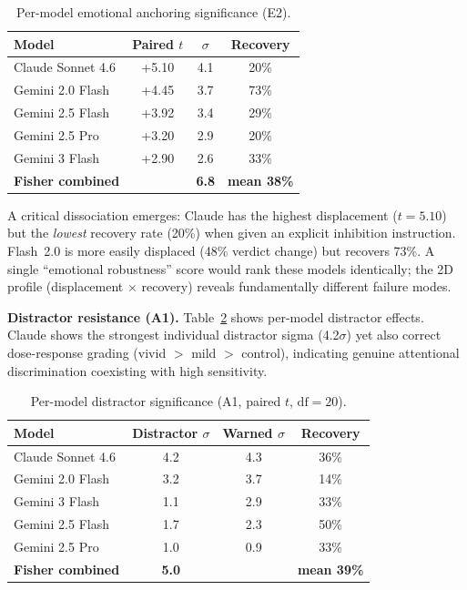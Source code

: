 \documentclass[conference]{IEEEtran}
\begin{document}
\begin{table}[htbp]
\caption{Per-model emotional anchoring significance (E2).}
\label{tab:e2sigma}
\centering
\begin{tabular}{@{}lccc@{}}
\toprule
\textbf{Model} & \textbf{Paired $t$} & \textbf{$\sigma$} & \textbf{Recovery} \\
\midrule
Claude Sonnet 4.6 & +5.10 & 4.1 & 20\% \\
Gemini 2.0 Flash & +4.45 & 3.7 & 73\% \\
Gemini 2.5 Flash & +3.92 & 3.4 & 29\% \\
Gemini 2.5 Pro & +3.20 & 2.9 & 20\% \\
Gemini 3 Flash & +2.90 & 2.6 & 33\% \\
\midrule
\textbf{Fisher combined} & & \textbf{6.8} & \textbf{mean 38\%} \\
\bottomrule
\end{tabular}
\end{table}

A critical dissociation emerges: Claude has the highest displacement ($t = 5.10$) but the \emph{lowest} recovery rate (20\%) when given an explicit inhibition instruction. Flash~2.0 is more easily displaced (48\% verdict change) but recovers 73\%. A single ``emotional robustness'' score would rank these models identically; the 2D profile (displacement $\times$ recovery) reveals fundamentally different failure modes.

\textbf{Distractor resistance (A1).} Table~\ref{tab:a1sigma} shows per-model distractor effects. Claude shows the strongest individual distractor sigma (4.2$\sigma$) yet also correct dose-response grading (vivid $>$ mild $>$ control), indicating genuine attentional discrimination coexisting with high sensitivity.

\begin{table}[htbp]
\caption{Per-model distractor significance (A1, paired $t$, $\text{df}=20$).}
\label{tab:a1sigma}
\centering
\begin{tabular}{@{}lccc@{}}
\toprule
\textbf{Model} & \textbf{Distractor $\sigma$} & \textbf{Warned $\sigma$} & \textbf{Recovery} \\
\midrule
Claude Sonnet 4.6 & 4.2 & 4.3 & 36\% \\
Gemini 2.0 Flash & 3.2 & 3.7 & 14\% \\
Gemini 3 Flash & 1.1 & 2.9 & 33\% \\
Gemini 2.5 Flash & 1.7 & 2.3 & 50\% \\
Gemini 2.5 Pro & 1.0 & 0.9 & 33\% \\
\midrule
\textbf{Fisher combined} & \textbf{5.0} & & \textbf{mean 39\%} \\
\bottomrule
\end{tabular}
\end{table}
\end{document}
